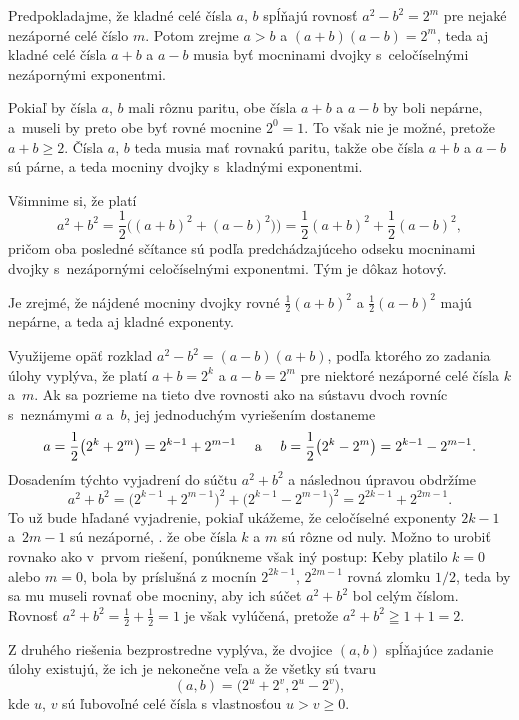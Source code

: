 {%
Predpokladajme, že kladné celé čísla $a$, $b$ spĺňajú rovnosť
$a^2 - b^2 = 2^m$ pre nejaké nezáporné celé číslo $m$.
Potom zrejme $a>b$ a $(a+b)(a-b) = 2^m$, teda aj kladné celé čísla
$a+b$ a $a-b$ musia byť mocninami dvojky s~celočíselnými
nezápornými exponentmi.

Pokiaľ by čísla $a$, $b$ mali rôznu paritu, obe čísla $a+b$ a
$a-b$ by boli nepárne, a~museli by preto obe byť rovné mocnine $2^0=1$.
To však nie je možné, pretože $a+b\geq2$.
Čísla $a$, $b$ teda musia mať rovnakú paritu,
takže obe čísla $a+b$ a $a-b$ sú párne, a teda mocniny dvojky
s~kladnými exponentmi.

Všimnime si, že platí
$$
a^2 + b^2 = \frac{1}{2}\bigl((a+b)^2 + (a-b)^2)\bigr) =
\frac{1}{2}(a+b)^2 + \frac{1}{2}(a-b)^2,
$$
pričom oba posledné sčítance sú podľa predchádzajúceho odseku
mocninami dvojky s~nezápornými celočíselnými exponentmi.
Tým je dôkaz hotový.

\poznamka
Je zrejmé, že nájdené mocniny dvojky rovné
$\frac{1}{2}(a+b)^2$ a $\frac{1}{2}(a-b)^2$ majú nepárne,
a teda aj kladné exponenty.

\ineriesenie
Využijeme opäť rozklad $a^2-b^2=(a-b)(a+b)$, podľa ktorého zo
zadania úlohy vyplýva, že platí
$a+b = 2^k$ a $a-b =2^m$ pre niektoré nezáporné celé čísla
$k$ a~$m$. Ak sa pozrieme na tieto dve rovnosti ako na
sústavu dvoch rovníc s~neznámymi $a$ a~$b$,
jej jednoduchým vyriešením dostaneme
$$
a =\frac12\bigl(2^{k}+2^{m}\bigr)=2^{k-1}+2^{m-1}\ \quad\hbox{a}\
\quad b=\frac12\bigl(2^{k}-2^{m}\bigr)=2^{k-1}-2^{m-1}.
$$
Dosadením týchto vyjadrení do súčtu $a^2+b^2$ a následnou
úpravou obdržíme
$$
a^2+b^2=\bigl(2^{k-1} + 2^{m-1}\bigr)^2+
\bigl(2^{k-1} - 2^{m-1}\bigr)^2
= 2^{2k-1} + 2^{2m-1}.
$$
To už bude hľadané vyjadrenie, pokiaľ ukážeme, že celočíselné
exponenty $2k-1$ a~${2m-1}$ sú nezáporné, \tj. že
obe čísla $k$ a $m$ sú rôzne od
nuly. Možno to urobiť rovnako ako v~prvom riešení, ponúkneme však
iný postup: Keby platilo $k=0$
alebo $m=0$, bola by príslušná z mocnín $2^{2k-1}$, $2^{2m-1}$
rovná zlomku $1/2$, teda by sa mu museli rovnať obe mocniny,
aby ich súčet $a^2+b^2$ bol celým číslom. Rovnosť
$a^2+b^2=\frac12+\frac12=1$ je však vylúčená, pretože
$a^2+b^2\geqq1+1=2$.

\poznamka
Z druhého riešenia bezprostredne vyplýva, že dvojice $(a,b)$ spĺňajúce
zadanie úlohy existujú, že ich je nekonečne veľa a
že všetky sú tvaru
$$
(a,b)=\bigl(2^u+2^v, 2^u-2^v\bigr),
$$
kde $u$, $v$ sú ľubovoľné celé čísla s vlastnosťou
$u>v\geq0$.


}
